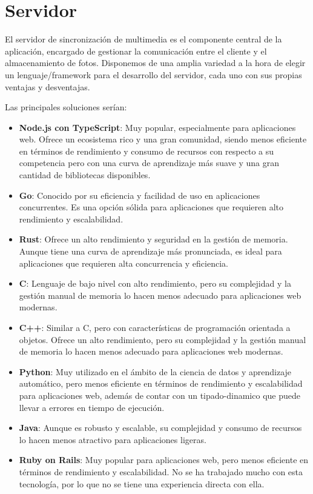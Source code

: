 \section{Servidor}
El servidor de sincronización de multimedia es el componente central de la aplicación, encargado de gestionar la comunicación entre el cliente y el almacenamiento de fotos.
Disponemos de una amplia variedad a la hora de elegir un lenguaje/\gls{framework} para el desarrollo del servidor, cada uno con sus propias ventajas y desventajas.

Las principales soluciones serían:
\begin{itemize}
    \item \textbf{Node.js con TypeScript}: Muy popular, especialmente para aplicaciones web. Ofrece un ecosistema rico y una gran comunidad, siendo menos eficiente en términos de rendimiento y consumo de recursos con respecto a su competencia pero con una curva de aprendizaje más suave y una gran cantidad de bibliotecas disponibles.
    \item \textbf{Go}: Conocido por su eficiencia y facilidad de uso en aplicaciones concurrentes. Es una opción sólida para aplicaciones que requieren alto rendimiento y escalabilidad.
    \item \textbf{Rust}: Ofrece un alto rendimiento y seguridad en la gestión de memoria. Aunque tiene una curva de aprendizaje más pronunciada, es ideal para aplicaciones que requieren alta concurrencia y eficiencia.
    \item \textbf{C}: Lenguaje de bajo nivel con alto rendimiento, pero su complejidad y la gestión manual de memoria lo hacen menos adecuado para aplicaciones web modernas.
    \item \textbf{C++}: Similar a C, pero con características de programación orientada a objetos. Ofrece un alto rendimiento, pero su complejidad y la gestión manual de memoria lo hacen menos adecuado para aplicaciones web modernas.
    \item \textbf{Python}: Muy utilizado en el ámbito de la ciencia de datos y aprendizaje automático, pero menos eficiente en términos de rendimiento y escalabilidad para aplicaciones web, además de contar con un \gls{tipado-dinamico} que puede llevar a errores en tiempo de ejecución.
    \item \textbf{Java}: Aunque es robusto y escalable, su complejidad y consumo de recursos lo hacen menos atractivo para aplicaciones ligeras.
    \item \textbf{Ruby on Rails}: Muy popular para aplicaciones web, pero menos eficiente en términos de rendimiento y escalabilidad. No se ha trabajado mucho con esta tecnología, por lo que no se tiene una experiencia directa con ella.
\end{itemize}

